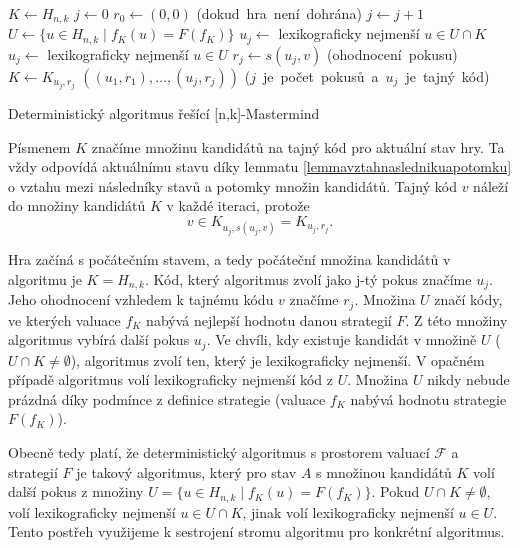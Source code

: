 
\begin{algorithm}[h!]
\begin{algorithmic}[1]  %
    \State $K \gets H_{n,k}$ 
    \State $j \gets 0$
    \State $r_0 \gets (0,0)$
     \hfill \mbox{(dokud hra není dohrána)}
        \State $j \gets j + 1$ 
	\State $U \gets \{u \in H_{n,k} \mid f_K(u) = F(f_K)\}$
            \State $u_j \gets$ lexikograficky nejmenší $u \in U \cap K$
	\Else
		\State $u_j \gets$ lexikograficky nejmenší $u \in U$
	\EndIf
        \State $r_j \gets s(u_j, v)$ \hfill \mbox{(ohodnocení pokusu)}
        \State $K \gets K_{u_j,r_j}$
    \EndWhile
    \State \Return $((u_1,r_1),\dots,(u_j, r_j))$ \hfill \mbox{($j$ je počet pokusů a $u_j$ je tajný kód)}
\EndFunction
\end{algorithmic}
\caption{Deterministický algoritmus řešící [n,k]-Mastermind}
\label{alg-default}
\end{algorithm}

Písmenem $K$ značíme množinu kandidátů na tajný kód pro aktuální stav hry. Ta vždy odpovídá aktuálnímu stavu díky lemmatu \ref{lemmavztahnaslednikuapotomku} o vztahu mezi následníky stavů a potomky množin kandidátů. Tajný kód $v$ náleží do množiny kandidátů $K$ v každé iteraci, protože 
\[v \in K_{u_j, s(u_j,v)} = K_{u_j, r_j}.\]

Hra začíná s počátečním stavem, a tedy počáteční množina kandidátů v algoritmu je $K = H_{n,k}$. Kód, který algoritmus zvolí jako j-tý pokus značíme $u_j$. Jeho ohodnocení vzhledem k tajnému kódu $v$ značíme $r_j$. Množina $U$ značí kódy, ve kterých valuace $f_K$ nabývá nejlepší hodnotu danou strategií $F$. Z této množiny algoritmus vybírá další pokus $u_j$. Ve chvíli, kdy existuje kandidát v množině $U$ ($U\cap K \neq \emptyset$), algoritmus zvolí ten, který je lexikograficky nejmenší. V opačném případě algoritmus volí lexikograficky nejmenší kód z $U$. Množina $U$ nikdy nebude prázdná díky podmínce z definice strategie (valuace $f_K$ nabývá hodnotu strategie $F(f_K)$). 

Obecně tedy platí, že deterministický algoritmus s prostorem valuací $\mathcal{F}$ a strategií $F$ je takový algoritmus, který pro stav $A$ s množinou kandidátů $K$ volí další pokus z množiny $U = \{u \in H_{n,k} \mid f_K(u) = F(f_K)\}$. Pokud $U \cap K \neq \emptyset$, volí lexikograficky nejmenší $u \in U \cap K$, jinak volí lexikograficky nejmenší $u \in U$. Tento postřeh využijeme k sestrojení stromu algoritmu pro konkrétní algoritmus.



